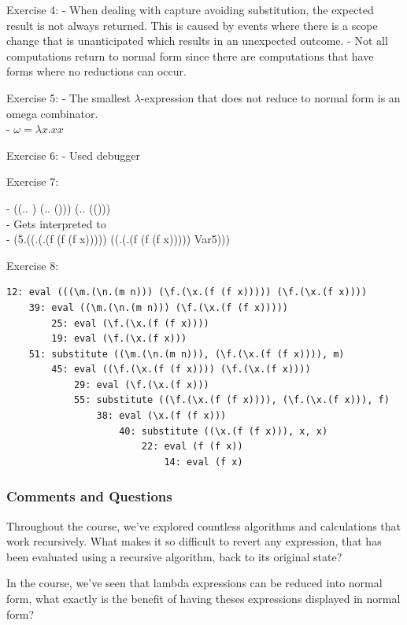 \documentclass{article}
\theoremstyle{theorem}
\theoremstyle{definition}
\theoremstyle{remark}
\begin{document}
Exercise 4:
- When dealing with capture avoiding substitution, the expected result is not always returned. This is caused by events where there is a scope change that is unanticipated which results in an unexpected outcome.
- Not all computations return to normal form since there are computations that have forms where no reductions can occur.
  
Exercise 5:
  - The smallest $\lambda$-expression that does not reduce to normal form is an omega combinator. \\ 
    - $\omega = \lambda x.xx$ 

Exercise 6:
  - Used debugger

Exercise 7:
  \newcommand{\m}{\text{m}}
  \newcommand{\n}{\text{n}}
  \newcommand{\f}{\text{f}}
  \newcommand{\x}{}
  \newcommand{\Var}{\text{Var}}

  - ((\m.\n. \m \n) (\f.\x. \f (\f \x))) (\f.\x. \f (\f (\f \x))) \\ 
  - Gets interpreted to \\ 
  - (\Var5.((\f.(\x.(f (f (f x))))) ((\f.(\x.(f (f (f x))))) Var5)))

Exercise 8:
\begin{verbatim}
12: eval (((\m.(\n.(m n))) (\f.(\x.(f (f x))))) (\f.(\x.(f x))))
    39: eval ((\m.(\n.(m n))) (\f.(\x.(f (f x)))))
        25: eval (\f.(\x.(f (f x))))
        19: eval (\f.(\x.(f x)))
    51: substitute ((\m.(\n.(m n))), (\f.(\x.(f (f x)))), m)
        45: eval ((\f.(\x.(f (f x)))) (\f.(\x.(f x))))
            29: eval (\f.(\x.(f x)))
            55: substitute ((\f.(\x.(f (f x)))), (\f.(\x.(f x))), f)
                38: eval (\x.(f (f x)))
                    40: substitute ((\x.(f (f x))), x, x)
                        22: eval (f (f x))
                            14: eval (f x)
\end{verbatim}

\subsubsection*{Comments and Questions}

Throughout the course, we've explored countless algorithms and calculations that work recursively. What makes it so difficult to revert any expression, that has been evaluated using a recursive algorithm, back to its original state?

In the course, we've seen that lambda expressions can be reduced into normal form, what exactly is the benefit of having theses expressions displayed in normal form?
\end{document}
